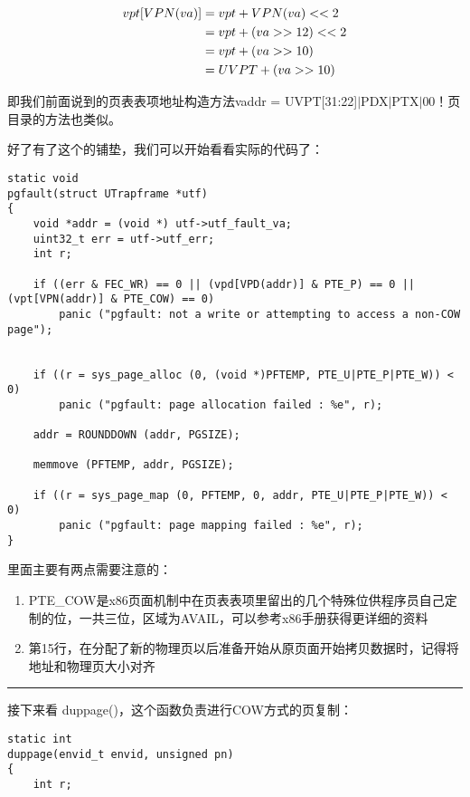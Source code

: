 \documentclass{article}
\newcommand{\funcname}[1]{{\ttfamily \small #1}}
\begin{document}
\begin{CJK*}{UTF8}{gkai}
\begin{align}
vpt[VPN(va)] &= vpt + VPN(va) << 2 \notag \\
             &= vpt + (va >> 12) << 2 \notag \\
             &= vpt + (va >> 10) \notag \\
             &= UVPT + (va >> 10) \notag  
\end{align}

即我们前面说到的页表表项地址构造方法vaddr = UVPT[31:22]$\left|\right.$PDX$\left|\right.$PTX$\left|\right.$00！页目录的方法也类似。


好了有了这个的铺垫，我们可以开始看看实际的代码了：

\begin{lstlisting}[style=ccode, title={\scriptsize \ttfamily \bfseries lib/fork.c: pgfault()}]
static void
pgfault(struct UTrapframe *utf)
{
    void *addr = (void *) utf->utf_fault_va;
    uint32_t err = utf->utf_err;
    int r;

    if ((err & FEC_WR) == 0 || (vpd[VPD(addr)] & PTE_P) == 0 ||  (vpt[VPN(addr)] & PTE_COW) == 0)
        panic ("pgfault: not a write or attempting to access a non-COW page");


    if ((r = sys_page_alloc (0, (void *)PFTEMP, PTE_U|PTE_P|PTE_W)) < 0)
        panic ("pgfault: page allocation failed : %e", r);

    addr = ROUNDDOWN (addr, PGSIZE);

    memmove (PFTEMP, addr, PGSIZE);

    if ((r = sys_page_map (0, PFTEMP, 0, addr, PTE_U|PTE_P|PTE_W)) < 0)
        panic ("pgfault: page mapping failed : %e", r);
}
\end{lstlisting}

里面主要有两点需要注意的：

\begin{enumerate}
\item{PTE\_COW是x86页面机制中在页表表项里留出的几个特殊位供程序员自己定制的位，一共三位，区域为AVAIL，可以参考x86手册获得更详细的资料}
\item{第15行，在分配了新的物理页以后准备开始从原页面开始拷贝数据时，记得将地址和物理页大小对齐}
\end{enumerate}

\vspace{2em}
\hrule
\vspace{2em}

接下来看 \funcname{duppage()}，这个函数负责进行COW方式的页复制：

\begin{lstlisting}[style=ccode, title={\scriptsize \ttfamily \bfseries lib/fork.c: duppage()}]
static int
duppage(envid_t envid, unsigned pn)
{
	int r;


\end{lstlisting}
\end{CJK*}
\end{document}
